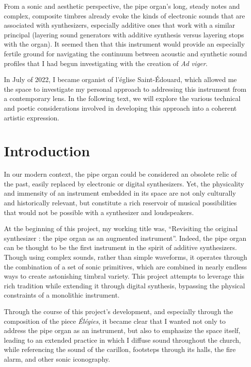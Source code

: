 \documentclass[12pt,twoside,maitrise]{dms_ks}
\theoremstyle{definition}
\begin{document}
 From a sonic and aesthetic perspective, the pipe organ's long, steady notes and complex, composite timbres already evoke the kinds of electronic sounds that are associated with synthesizers, especially additive ones that work with a similar principal (layering sound generators with additive synthesis versus layering stops with the organ). 
It seemed then that this instrument would provide an especially fertile ground for navigating the continuum between acoustic and synthetic sound profiles that I had begun investigating with the creation of \textit{Ad viger}.

In July of 2022, I became organist of l'église Saint-Édouard, which allowed me the space to investigate my personal approach to addressing this instrument from a contemporary lens. In the following text, we will explore the various technical and poetic considerations involved in developing this approach into a coherent artistic expression. 

\chapter*{Introduction}

In our modern context, the pipe organ could be considered an obsolete relic of the past, easily replaced by electronic or digital synthesizers. 
Yet, the physicality and immensity of an instrument embedded in its space are not only culturally and historically relevant, but constitute a rich reservoir of musical possibilities that would not be possible with a synthesizer and loudspeakers. 

At the beginning of this project, my working title was, “Revisiting the original synthesizer : the pipe organ as an augmented instrument”. 
Indeed, the pipe organ can be thought to be the first instrument in the spirit of additive synthesizers. 
Though using complex sounds, rather than simple waveforms, it operates through the combination of a set of sonic primitives, which are combined in nearly endless ways to create astonishing timbral variety. 
This project attempts to leverage this rich tradition while extending it through digital synthesis, bypassing the physical constraints of a monolithic instrument.	

Through the course of this project’s development, and especially through the composition of the piece \textit{Élégies}, it became clear that I wanted not only to address the pipe organ as an instrument, but also to emphasize the space itself, leading to an extended practice in which I diffuse sound throughout the church, while referencing the sound of the carillon, footsteps through its halls, the fire alarm, and other sonic iconography. 	
\end{document}
